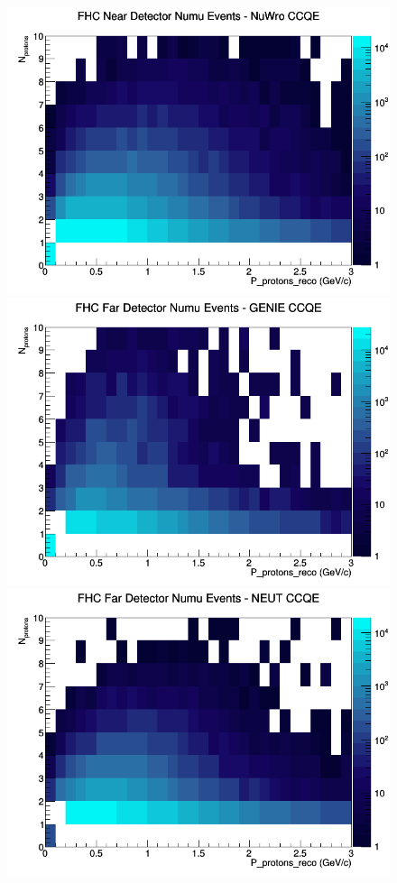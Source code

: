 \documentclass[12pt]{article}
\begin{document}
\begin{figure}[h]
\includegraphics[width=\linewidth]{eff_N_P/GAr/protons/CCQE_FHC_ND_numu_N_P_NuWro.png}
\endminipage
\newline
{}
\includegraphics[width=\linewidth]{eff_N_P/GAr/protons/CCQE_FHC_FD_numu_N_P_GENIE.png}
\endminipage
{}
\includegraphics[width=\linewidth]{eff_N_P/GAr/protons/CCQE_FHC_FD_numu_N_P_NEUT.png}

\end{figure}
\end{document}
